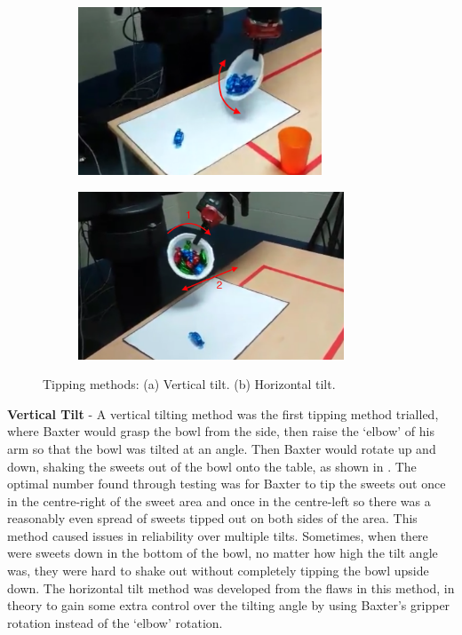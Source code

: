 \begin{figure}[H]
    \captionsetup[subfigure]{justification=centering}
    \begin{subfigure}[H]{0.475\textwidth}   
        \centering 
        \caption{}
        \label{fig:verticaltilt}
        \includegraphics[width=\textwidth, height=5cm]{verticaltilt.png}
    \end{subfigure}
    \begin{subfigure}[H]{0.475\textwidth}   
        \centering 
        \caption{}
        \label{fig:horizontaltilt}
        \includegraphics[width=\textwidth, height=5cm]{horizontaltilt.png}
    \end{subfigure}
    \caption{Tipping methods: (a) Vertical tilt. (b) Horizontal tilt.}
\end{figure}
\textbf{Vertical Tilt} - 
A vertical tilting method was the first tipping method trialled, where Baxter would grasp the bowl from the side, then raise the `elbow' of his arm so that the bowl was tilted at an angle. Then Baxter would rotate up and down, shaking the sweets out of the bowl onto the table,  as shown in \textbf{}. The optimal number found through testing was for Baxter to tip the sweets out once in the centre-right of the sweet area and once in the centre-left so there was a reasonably even spread of sweets tipped out on both sides of the area. This method caused issues in reliability over multiple tilts. Sometimes, when there were sweets down in the bottom of the bowl, no matter how high the tilt angle was, they were hard to shake out without completely tipping the bowl upside down. The horizontal tilt method was developed from the flaws in this method, in theory to gain some extra control over the tilting angle by using Baxter's gripper rotation instead of the `elbow' rotation.
